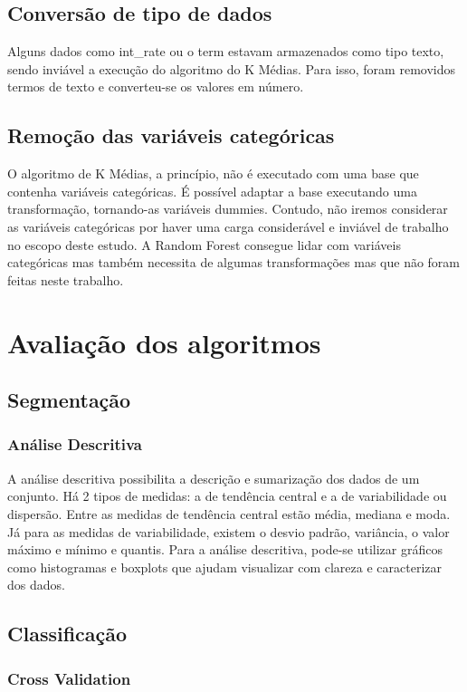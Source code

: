 \subsection{Conversão de tipo de dados}
Alguns dados como int\_rate ou o term estavam armazenados como tipo texto, sendo inviável a execução do algoritmo do K Médias. Para isso, foram removidos termos de texto e converteu-se os valores em número.


\subsection{Remoção das variáveis categóricas}
O algoritmo de K Médias, a princípio, não é executado com uma base que contenha variáveis categóricas. É possível adaptar a base executando uma transformação, tornando-as variáveis dummies. Contudo, não iremos considerar as variáveis categóricas por haver uma carga considerável e inviável de trabalho no escopo deste estudo. A Random Forest consegue lidar com variáveis categóricas mas também necessita de algumas transformações mas que não foram feitas neste trabalho.


\section{Avaliação dos algoritmos}

\subsection{Segmentação}

\subsubsection{Análise Descritiva}
A análise descritiva possibilita a descrição e sumarização dos dados de um conjunto. Há 2 tipos de medidas: a de tendência central e a de variabilidade ou dispersão. Entre as medidas de tendência central estão média, mediana e moda. Já para as medidas de variabilidade, existem o desvio padrão, variância, o valor máximo e mínimo e quantis.
Para a análise descritiva, pode-se utilizar gráficos como histogramas e boxplots que ajudam visualizar com clareza e caracterizar dos dados.


\subsection{Classificação}

\subsubsection{Cross Validation}

